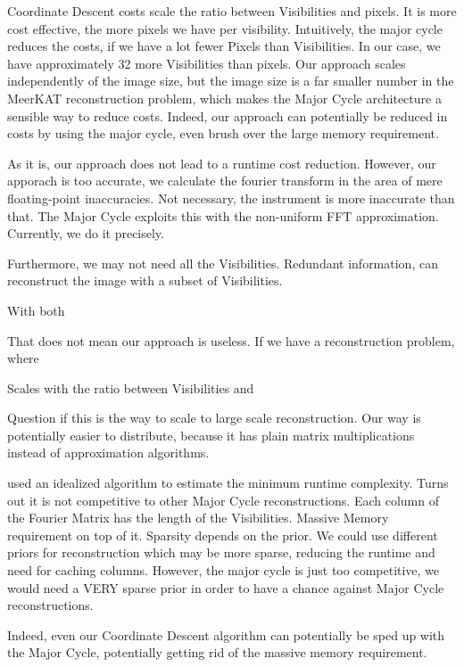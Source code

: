 Coordinate Descent costs scale the ratio between Visibilities and pixels. It is more cost effective, the more pixels we have per visibility.
Intuitively, the major cycle reduces the costs, if we have a lot fewer Pixels than Visibilities. In our case, we have approximately 32 more Visibilities than pixels. Our approach scales independently of the image size, but the image size is a far smaller number in the MeerKAT reconstruction problem, which makes the Major Cycle architecture a sensible way to reduce costs. Indeed, our approach can potentially be reduced in costs by using the major cycle, even brush over the large memory requirement.

As it is, our approach does not lead to a runtime cost reduction. However, our apporach is too accurate, we calculate the fourier transform in the area of mere floating-point inaccuracies. Not necessary, the instrument is more inaccurate than that. The Major Cycle exploits this with the non-uniform FFT approximation. Currently, we do it precisely.

Furthermore, we may not need all the Visibilities. Redundant information, can reconstruct the image with a subset of Visibilities.

With both 



That does not mean our approach is useless. If we have a reconstruction problem, where 

Scales with the ratio between Visibilities and 

Question if this is the way to scale to large scale reconstruction. Our way is potentially easier to distribute, because it has plain matrix multiplications instead of approximation algorithms.

used an idealized algorithm to estimate the minimum runtime complexity. Turns out it is not competitive to other Major Cycle reconstructions. Each column of the Fourier Matrix has the length of the Visibilities. Massive Memory requirement on top of it.  Sparsity depends on the prior. We could use different priors for reconstruction which may be more sparse, reducing the runtime and need for caching columns. However, the major cycle is just too competitive, we would need a VERY sparse prior in order to have a chance against Major Cycle reconstructions.

Indeed, even our Coordinate Descent algorithm can potentially be sped up with the Major Cycle, potentially getting rid of the massive memory requirement.









 
